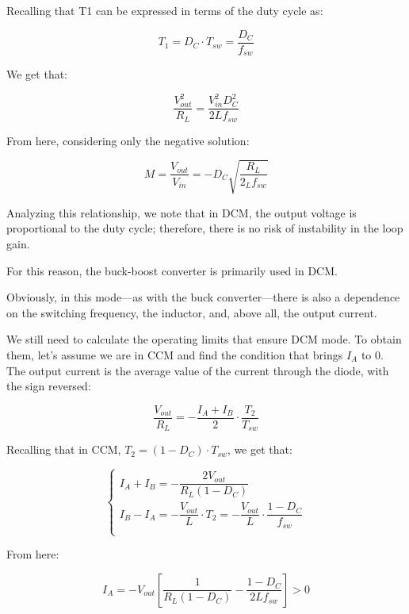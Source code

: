 \documentclass[../main.tex]{subfiles}
\begin{document}
Recalling that T1 can be expressed in terms of the duty cycle as:

\begin{equation}
	T_1 = D_C \cdot T_{sw} = \frac{D_C}{f_{sw}}
\end{equation}


We get that:

\begin{equation}
	\frac{V_{out}^2}{R_L} = \frac{V_{in}^2D^2_C}{2Lf_{sw}}
\end{equation}

From here, considering only the negative solution:

\begin{equation}
	M = \frac{V_{out}}{V_{in}} = -D_C \sqrt{\frac{R_L}{2_Lf_{sw}}}
\end{equation}

Analyzing this relationship, we note that in DCM, the output voltage is proportional to the duty cycle; therefore, there is no risk of instability in the loop gain. 

For this reason, the buck-boost converter is primarily used in DCM.

Obviously, in this mode—as with the buck converter—there is also a dependence on the switching frequency, the inductor, and, above all, the output current.

We still need to calculate the operating limits that ensure DCM mode. To obtain them, let’s assume we are in CCM and find the condition that brings $I_A$ to 0. The output current is the average value of the current through the diode, with the sign reversed:

\begin{equation}
	\frac{V_{out}}{R_L} = - \frac{I_A + I_B}{2} \cdot \frac{T_2}{T_{sw}}
\end{equation}

Recalling that in CCM, $T_2 = (1 - D_C) \cdot T_{sw}$, we get that:

\begin{equation}
\begin{cases}
	I_A + I_B = - \dfrac{2V_{out}}{R_L(1-D_C)} \\
	I_B - I_A = - \dfrac{V_{out}}{L} \cdot T_2 = - \dfrac{V_{out}}{L} \cdot \dfrac{1 - D_C}{f_{sw}}\\
\end{cases}	
\end{equation}

From here:

\begin{equation}
	I_A = -V_{out} \left[ \frac{1}{R_L(1-D_C)} - \frac{1-D_C}{2Lf_{sw}} \right] > 0
\end{equation}
\end{document}
